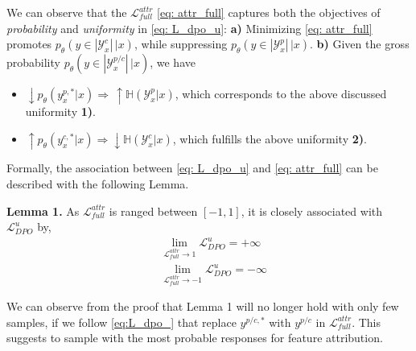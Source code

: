 \documentclass[11pt]{article}
\begin{document}
We can observe that the $\mathcal L_{full}^{attr}$ \eqref{eq: attr_full} captures both the objectives of \textit{probability} and \textit{uniformity} in \eqref{eq: L_dpo_u}: \textbf{a)} Minimizing \eqref{eq: attr_full} promotes $p_\theta(y\in |\mathcal Y^{c}_x|\,|x)$, while suppressing $p_\theta(y\in |\mathcal Y^{p}_x|\,|x)$.
\textbf{b)} Given the gross probability $p_\theta(y\in |\mathcal Y^{p/c}_x|\,|x)$, we have
%
\begin{itemize}
    \item $\downarrow \!\!p_\theta(y^{p,*}_x|x) \Rightarrow \,\uparrow \!\!\mathbb H(\mathcal Y^p_x|x)$, which corresponds to the above discussed uniformity \textbf{1)}.
    \item $\uparrow p_\theta(y^{c,*}_x|x) \Rightarrow \downarrow \mathbb H(\mathcal Y^c_x|x)$, which fulfills  the above uniformity \textbf{2)}.
\end{itemize}
%

\noindent Formally, the association between  \eqref{eq: L_dpo_u} and \eqref{eq: attr_full} can be described with the following Lemma.

\vspace{1mm}
\noindent\textbf{Lemma 1.} As $\mathcal L^{attr}_{full}$ is ranged between $[-1,1]$, it is closely associated with $\mathcal L_{DPO}^u$ by,
\begin{align}
    &\lim_{\mathcal L^{attr}_{full}\rightarrow 1}  \mathcal L^u_{DPO} = +\infty \\
    &\lim_{\mathcal L^{attr}_{full}\rightarrow -1}  \mathcal L^u_{DPO} = -\infty 
\end{align}

We can observe from the proof that Lemma 1 will no longer hold with only few samples, if we follow \eqref{eq:L_dpo_} that replace $y^{p/c,*}$ with $y^{p/c}$ in $\mathcal L_{full}^{attr}$. 
This suggests to sample with the most probable responses for feature attribution.
\end{document}
